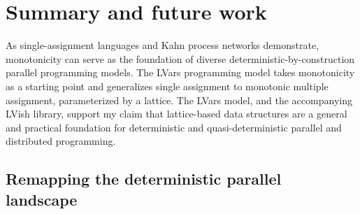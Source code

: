 \chapter{Summary and future work}\label{ch:conclusion} %

As single-assignment languages and Kahn process networks demonstrate,
monotonicity can serve as the foundation of diverse
deterministic-by-construction parallel programming models.  The LVars
programming model takes monotonicity as a starting point and
generalizes single assignment to monotonic multiple assignment,
parameterized by a lattice.  The LVars model, and the accompanying
LVish library, support my claim that lattice-based data structures are
a general and practical foundation for deterministic and
quasi-deterministic parallel and distributed programming.

\section{Remapping the deterministic parallel landscape}

